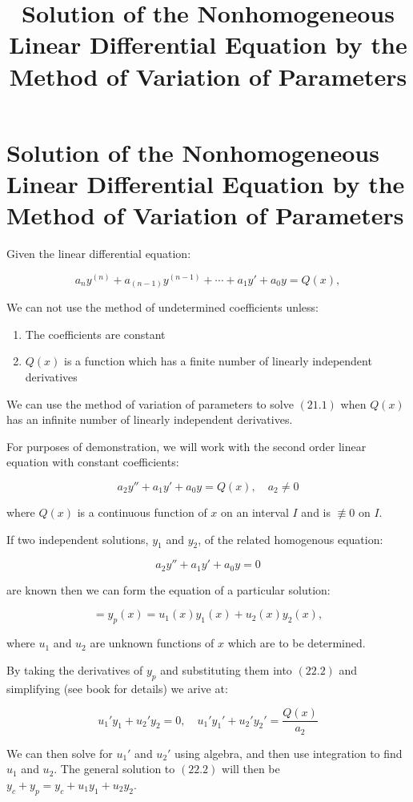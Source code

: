 \documentclass{article}
\title{Solution of the Nonhomogeneous Linear Differential Equation by the Method of Variation of Parameters}
\begin{document}
\section{Solution of the Nonhomogeneous Linear Differential Equation by the Method of Variation of Parameters}

Given the linear differential equation:

\[ \tag{22.1} a_ny^{(n)} + a_{(n-1)}y^{(n-1)} + \cdots + a_1y' + a_0y = Q(x), \]

We can not use the method of undetermined coefficients unless:

\begin{enumerate}
\item The coefficients are constant
\item $Q(x)$ is a function which has a finite number of linearly independent derivatives
\end{enumerate}

We can use the method of variation of parameters to solve $(21.1)$ when $Q(x)$ has an infinite number of linearly independent derivatives.

For purposes of demonstration, we will work with the second order linear equation with constant coefficients:

\[ \tag{22.2} a_2y'' + a_1y' + a_0y = Q(x), \quad a_2 \neq 0 \]

where $Q(x)$ is a \@{continuous} function of $x$ on an interval $I$ and is $\not\equiv 0$ on $I$.

If two independent solutions, $y_1$ and $y_2$, of the related homogenous equation:

\[ \tag{22.21} a_2y'' + a_1y' + a_0y = 0 \]

are known then we can form the equation of a particular solution:

\[ \tag{22.22} = y_p(x) = u_1(x)y_1(x) + u_2(x)y_2(x), \]

where $u_1$ and $u_2$ are unknown functions of $x$ which are to be determined.

By taking the derivatives of $y_p$ and substituting them into $(22.2)$ and simplifying (see book for details) we arive at:

\[ \tag{22.27} {u_1}'y_1 + {u_2}'y_2 = 0, \quad {u_1}'{y_1}' + {u_2}'{y_2}' = \frac{Q(x)}{a_2} \]

We can then solve for ${u_1}'$ and ${u_2}'$ using algebra, and then use integration to find $u_1$ and $u_2$. The general solution to $(22.2)$ will then be $y_c + y_p = y_c + u_1 y_1 + u_2 y_2$.
\end{document}
